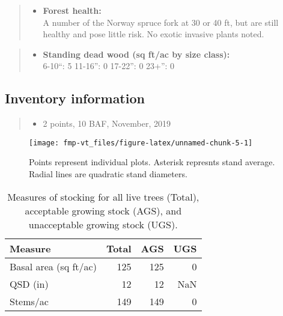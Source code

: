 \documentclass[]{tufte-handout}
\providecommand{\tightlist}{%
  \setlength{\itemsep}{0pt}\setlength{\parskip}{0pt}}
\begin{document}
\begin{quote}
\begin{itemize}
\tightlist
\item
  \textbf{Forest health:}\\
  \vspace{2pt} A number of the Norway spruce fork at 30 or 40 ft, but
  are still healthy and pose little risk. No exotic invasive plants
  noted.
\end{itemize}
\end{quote}

\begin{quote}
\begin{itemize}
\tightlist
\item
  \textbf{Standing dead wood (sq ft/ac by size class):}\\
  \vspace{2pt} \indent \small 6-10``: 5 \textbar{} 11-16'': 0 \textbar{}
  17-22'': 0 \textbar{} 23+'': 0
\end{itemize}
\end{quote}

\subsection{Inventory information}\label{inventory-information}

\begin{quote}
\begin{itemize}
\tightlist
\item
  2 points, 10 BAF, November, 2019
\end{itemize}
\end{quote}

\begin{figure}
\texttt{[image: fmp-vt\_files/figure-latex/unnamed-chunk-5-1]} \caption[Points represent individual plots]{Points represent individual plots. Asterisk represnts stand average. Radial lines are quadratic stand diameters.}\label{fig:unnamed-chunk-5}
\end{figure}

\begin{table}

\caption{\label{tab:unnamed-chunk-6}Measures of stocking for all live trees (Total), acceptable growing stock (AGS), and unacceptable growing stock (UGS).}
\centering
\begin{tabular}[t]{lrrr}
\toprule
Measure & Total & AGS & UGS\\
\midrule
Basal area (sq ft/ac) & 125 & 125 & 0\\
QSD (in) & 12 & 12 & NaN\\
Stems/ac & 149 & 149 & 0\\
\bottomrule
\end{tabular}
\end{table}
\end{document}
